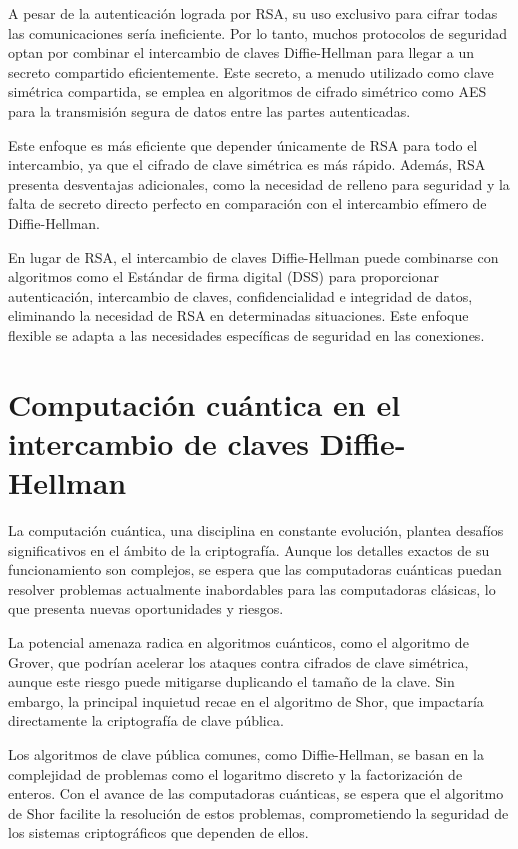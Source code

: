 \documentclass[11pt]{article}
\begin{document}
A pesar de la autenticación lograda por RSA, su uso exclusivo para cifrar todas las comunicaciones sería ineficiente. Por lo tanto, muchos protocolos de seguridad optan por combinar el intercambio de claves Diffie-Hellman para llegar a un secreto compartido eficientemente. Este secreto, a menudo utilizado como clave simétrica compartida, se emplea en algoritmos de cifrado simétrico como AES para la transmisión segura de datos entre las partes autenticadas.

Este enfoque es más eficiente que depender únicamente de RSA para todo el intercambio, ya que el cifrado de clave simétrica es más rápido. Además, RSA presenta desventajas adicionales, como la necesidad de relleno para seguridad y la falta de secreto directo perfecto en comparación con el intercambio efímero de Diffie-Hellman.

En lugar de RSA, el intercambio de claves Diffie-Hellman puede combinarse con algoritmos como el Estándar de firma digital (DSS) para proporcionar autenticación, intercambio de claves, confidencialidad e integridad de datos, eliminando la necesidad de RSA en determinadas situaciones. Este enfoque flexible se adapta a las necesidades específicas de seguridad en las conexiones.


\section{Computación cuántica en el intercambio de claves Diffie-Hellman}

La computación cuántica, una disciplina en constante evolución, plantea desafíos significativos en el ámbito de la criptografía. Aunque los detalles exactos de su funcionamiento son complejos, se espera que las computadoras cuánticas puedan resolver problemas actualmente inabordables para las computadoras clásicas, lo que presenta nuevas oportunidades y riesgos.

La potencial amenaza radica en algoritmos cuánticos, como el algoritmo de Grover, que podrían acelerar los ataques contra cifrados de clave simétrica, aunque este riesgo puede mitigarse duplicando el tamaño de la clave. Sin embargo, la principal inquietud recae en el algoritmo de Shor, que impactaría directamente la criptografía de clave pública.

Los algoritmos de clave pública comunes, como Diffie-Hellman, se basan en la complejidad de problemas como el logaritmo discreto y la factorización de enteros. Con el avance de las computadoras cuánticas, se espera que el algoritmo de Shor facilite la resolución de estos problemas, comprometiendo la seguridad de los sistemas criptográficos que dependen de ellos.
\end{document}
